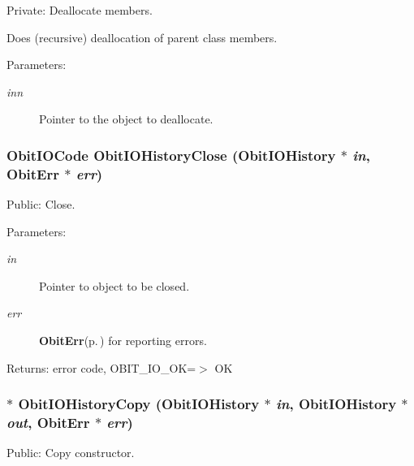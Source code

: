 Private: Deallocate members. 

Does (recursive) deallocation of parent class members. \begin{Desc}
\item[Parameters:]
\begin{description}
\item[{\em inn}]Pointer to the object to deallocate. \end{description}
\end{Desc}
\subsubsection{\setlength{\rightskip}{0pt plus 5cm}Obit\-IOCode Obit\-IOHistory\-Close ({\bf Obit\-IOHistory} $\ast$ {\em in}, {\bf Obit\-Err} $\ast$ {\em err})}\label{ObitIOHistory_8c_a12}


Public: Close. 

\begin{Desc}
\item[Parameters:]
\begin{description}
\item[{\em in}]Pointer to object to be closed. \item[{\em err}]{\bf Obit\-Err}{\rm (p.\,\pageref{structObitErr})} for reporting errors. \end{description}
\end{Desc}
\begin{Desc}
\item[Returns:]error code, OBIT\_\-IO\_\-OK=$>$ OK \end{Desc}
\subsubsection{$\ast$ Obit\-IOHistory\-Copy ({\bf Obit\-IOHistory} $\ast$ {\em in}, {\bf Obit\-IOHistory} $\ast$ {\em out}, {\bf Obit\-Err} $\ast$ {\em err})}\label{ObitIOHistory_8c_a10}


Public: Copy constructor. 


